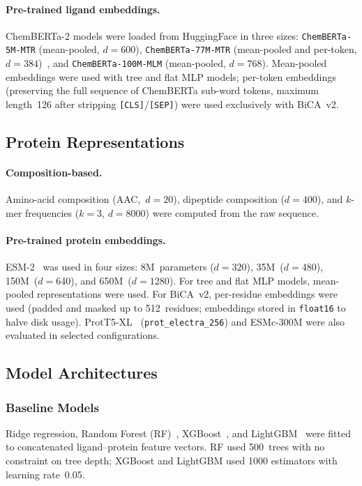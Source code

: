 \documentclass[11pt,twocolumn]{article}
\begin{document}
\paragraph{Pre-trained ligand embeddings.}
ChemBERTa-2 models were loaded from HuggingFace in three sizes:
\texttt{ChemBERTa-5M-MTR} (mean-pooled, $d=600$),
\texttt{ChemBERTa-77M-MTR} (mean-pooled and per-token,
$d=384$)~\cite{ahmad2022chemberta2}, and
\texttt{ChemBERTa-100M-MLM} (mean-pooled, $d=768$).
Mean-pooled embeddings were used with tree and flat MLP models; per-token
embeddings (preserving the full sequence of ChemBERTa sub-word tokens,
maximum length~126 after stripping \texttt{[CLS]}/\texttt{[SEP]}) were used
exclusively with BiCA~v2.

\subsection{Protein Representations}

\paragraph{Composition-based.}
Amino-acid composition (AAC,~$d=20$), dipeptide composition ($d=400$), and
$k$-mer frequencies ($k=3$, $d=8000$) were computed from the raw sequence.

\paragraph{Pre-trained protein embeddings.}
ESM-2~\cite{lin2023esm2} was used in four sizes: 8M~parameters
($d=320$), 35M~($d=480$), 150M~($d=640$), and 650M~($d=1280$).
For tree and flat MLP models, mean-pooled representations were used.
For BiCA~v2, per-residue embeddings were used (padded and masked up to
512~residues; embeddings stored in \texttt{float16} to halve disk usage).
ProtT5-XL~\cite{elnaggar2021prottrans} (\texttt{prot\_electra\_256})
and ESMc-300M were also evaluated in selected configurations.

\subsection{Model Architectures}

\subsubsection{Baseline Models}
Ridge regression, Random Forest (RF)~\cite{breiman2001rf},
XGBoost~\cite{chen2016xgboost}, and LightGBM~\cite{ke2017lightgbm} were
fitted to concatenated ligand--protein feature vectors.  RF used 500~trees
with no constraint on tree depth; XGBoost and LightGBM used 1000 estimators
with learning rate~0.05.
\end{document}
